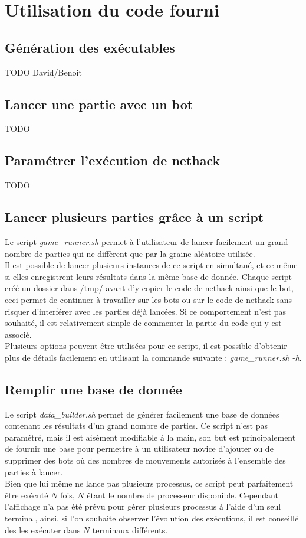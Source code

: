 \documentclass[10pt,a4paper]{report}
\begin{document}
\chapter{Utilisation du code fourni}
\section{Génération des exécutables}
TODO David/Benoit
\section{Lancer une partie avec un bot}
TODO
\section{Paramétrer l'exécution de nethack}
TODO
\section{Lancer plusieurs parties grâce à un script}
Le script \emph{game\_runner.sh} permet à l'utilisateur de lancer facilement
un grand nombre de parties qui ne diffèrent que par la graine aléatoire
utilisée.
\\
Il est possible de lancer plusieurs instances de ce script en simultané, et ce
même si elles enregistrent leurs résultats dans la même base de donnée. Chaque
script créé un dossier dans /tmp/ avant d'y copier le code de nethack ainsi que
le bot, ceci permet de continuer à travailler sur les bots ou sur le code de
nethack sans risquer d'interférer avec les parties déjà lancées. Si ce
comportement n'est pas souhaité, il est relativement simple de commenter la
partie du code qui y est associé.
\\
Plusieurs options peuvent être utilisées pour ce script, il est possible
d'obtenir plus de détails facilement en utilisant la commande suivante :
\emph{game\_runner.sh -h}.
\section{Remplir une base de donnée}
Le script \emph{data\_builder.sh} permet de générer facilement une base de
données contenant les résultats d'un grand nombre de parties. Ce script n'est
pas paramétré, mais il est aisément modifiable à la main, son but est
principalement de fournir une base pour permettre à un utilisateur novice
d'ajouter ou de supprimer des bots où des nombres de mouvements autorisés à
l'ensemble des parties à lancer.
\\
Bien que lui même ne lance pas plusieurs processus, ce script peut
parfaitement être exécuté $N$ fois, $N$ étant le nombre de processeur
disponible. Cependant l'affichage n'a pas été prévu pour gérer plusieurs
processus à l'aide d'un seul terminal, ainsi, si l'on souhaite observer
l'évolution des exécutions, il est conseillé des les exécuter dans $N$
terminaux différents.
\end{document}
